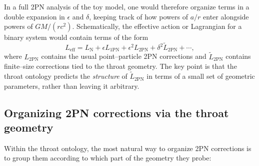\documentclass[12pt]{article}
\begin{document}
In a full 2PN analysis of the toy model, one would therefore organize terms
in a double expansion in $\epsilon$ and $\delta$, keeping track of how
powers of $a/r$ enter alongside powers of $GM/(rc^2)$.  Schematically, the
effective action or Lagrangian for a binary system would contain terms of
the form
\begin{equation}
  L_{\mathrm{eff}}
  = L_{\mathrm{N}}
    + \epsilon L_{\mathrm{1PN}}
    + \epsilon^2 L_{\mathrm{2PN}}
    + \delta^2 \tilde{L}_{\mathrm{2PN}}
    + \cdots,
\end{equation}
where $L_{\mathrm{2PN}}$ contains the usual point--particle 2PN corrections
and $\tilde{L}_{\mathrm{2PN}}$ contains finite--size corrections tied to the
throat geometry.  The key point is that the throat ontology predicts the
\emph{structure} of $\tilde{L}_{\mathrm{2PN}}$ in terms of a small set of
geometric parameters, rather than leaving it arbitrary.

\subsection{Organizing 2PN corrections via the throat geometry}
\label{subsec:2pn_organization}

Within the throat ontology, the most natural way to organize 2PN corrections
is to group them according to which part of the geometry they probe:
\end{document}
